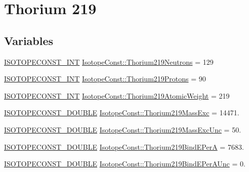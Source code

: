\hypertarget{group___isotope_const-_thorium-_th219}{}\section{Thorium 219}
\label{group___isotope_const-_thorium-_th219}
\subsection*{Variables}
\begin{DoxyCompactItemize}
\item 
\mbox{\hyperlink{group___isotope_const-_macros_ga5f18360b3e99483a35c32d789e62621c}{I\+S\+O\+T\+O\+P\+E\+C\+O\+N\+S\+T\+\_\+\+I\+NT}} \mbox{\hyperlink{group___isotope_const-_thorium-_th219_ga2ca6a370686ab643d13213b1f60a7f31}{Isotope\+Const\+::\+Thorium219\+Neutrons}} = 129
\item 
\mbox{\hyperlink{group___isotope_const-_macros_ga5f18360b3e99483a35c32d789e62621c}{I\+S\+O\+T\+O\+P\+E\+C\+O\+N\+S\+T\+\_\+\+I\+NT}} \mbox{\hyperlink{group___isotope_const-_thorium-_th219_ga262a0ee157cefbcde2bf4d08eec4107e}{Isotope\+Const\+::\+Thorium219\+Protons}} = 90
\item 
\mbox{\hyperlink{group___isotope_const-_macros_ga5f18360b3e99483a35c32d789e62621c}{I\+S\+O\+T\+O\+P\+E\+C\+O\+N\+S\+T\+\_\+\+I\+NT}} \mbox{\hyperlink{group___isotope_const-_thorium-_th219_gaedcf9783431cb3ae135733c55868de37}{Isotope\+Const\+::\+Thorium219\+Atomic\+Weight}} = 219
\item 
\mbox{\hyperlink{group___isotope_const-_macros_ga8f45a7272ce02c0b4c65c44636ed719a}{I\+S\+O\+T\+O\+P\+E\+C\+O\+N\+S\+T\+\_\+\+D\+O\+U\+B\+LE}} \mbox{\hyperlink{group___isotope_const-_thorium-_th219_gad269470df2d5c5eb9ec91dffd3303e85}{Isotope\+Const\+::\+Thorium219\+Mass\+Exc}} = 14471.
\item 
\mbox{\hyperlink{group___isotope_const-_macros_ga8f45a7272ce02c0b4c65c44636ed719a}{I\+S\+O\+T\+O\+P\+E\+C\+O\+N\+S\+T\+\_\+\+D\+O\+U\+B\+LE}} \mbox{\hyperlink{group___isotope_const-_thorium-_th219_gaa154d8161046a7da5b82a62d0b8c5448}{Isotope\+Const\+::\+Thorium219\+Mass\+Exc\+Unc}} = 50.
\item 
\mbox{\hyperlink{group___isotope_const-_macros_ga8f45a7272ce02c0b4c65c44636ed719a}{I\+S\+O\+T\+O\+P\+E\+C\+O\+N\+S\+T\+\_\+\+D\+O\+U\+B\+LE}} \mbox{\hyperlink{group___isotope_const-_thorium-_th219_ga51888340e3a002f24214f73e6da1b614}{Isotope\+Const\+::\+Thorium219\+Bind\+E\+PerA}} = 7683.
\item 
\mbox{\hyperlink{group___isotope_const-_macros_ga8f45a7272ce02c0b4c65c44636ed719a}{I\+S\+O\+T\+O\+P\+E\+C\+O\+N\+S\+T\+\_\+\+D\+O\+U\+B\+LE}} \mbox{\hyperlink{group___isotope_const-_thorium-_th219_ga9579d3a819810c5b9ac6f3855d9abfa1}{Isotope\+Const\+::\+Thorium219\+Bind\+E\+Per\+A\+Unc}} = 0.

\end{DoxyCompactItemize}
